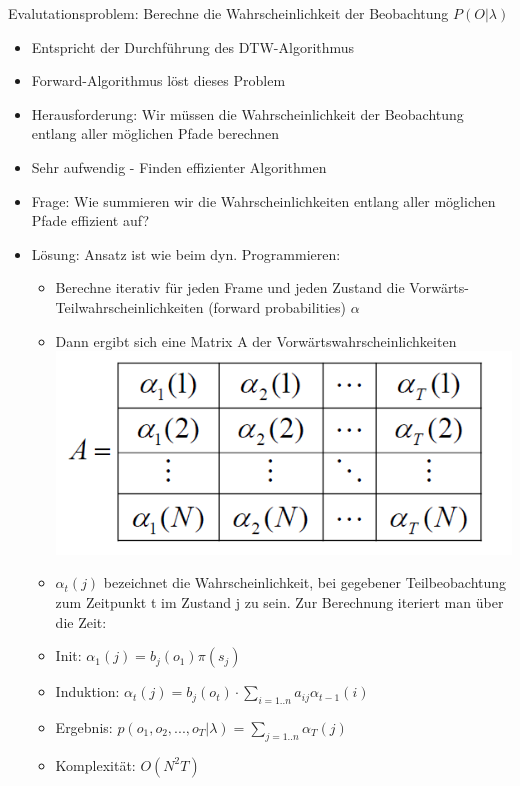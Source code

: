 \documentclass[a4paper,10pt,oneside]{article}
\begin{document}
Evalutationsproblem: Berechne die Wahrscheinlichkeit der Beobachtung $P(O|\lambda)$
	\begin{itemize}
		\item Entspricht der Durchführung des DTW-Algorithmus
		\item Forward-Algorithmus löst dieses Problem
		\item Herausforderung: Wir müssen die Wahrscheinlichkeit der Beobachtung entlang aller möglichen Pfade berechnen
		\item Sehr aufwendig - Finden effizienter Algorithmen
		\item Frage: Wie summieren wir die Wahrscheinlichkeiten entlang aller möglichen Pfade effizient auf?
		\item Lösung: Ansatz ist wie beim dyn. Programmieren:
			\begin{itemize}
				\item Berechne iterativ für jeden Frame und jeden Zustand die Vorwärts-Teilwahrscheinlichkeiten (forward probabilities) $\alpha$
				\item Dann ergibt sich eine Matrix A der Vorwärtswahrscheinlichkeiten \\ \includegraphics[scale=0.2]{Grafiken/hmm-fa-A.png}
				\item $\alpha_t(j)$ bezeichnet die Wahrscheinlichkeit, bei gegebener Teilbeobachtung zum Zeitpunkt t im Zustand j zu sein. Zur Berechnung iteriert man über die Zeit:
				\item Init: $\alpha_1(j) = b_j(o_1) \pi(s_j)$
				\item Induktion: $\alpha_t(j) = b_j(o_t) \cdot \sum_{i=1..n} a_{ij} \alpha_{t-1}(i)$ 
				\item Ergebnis: $p(o_1,o_2,...,o_T|\lambda) = \sum_{j=1..n} \alpha_T(j)$
				\item Komplexität: $O(N^2T)$
			\end{itemize}
	\end{itemize}
\end{document}
